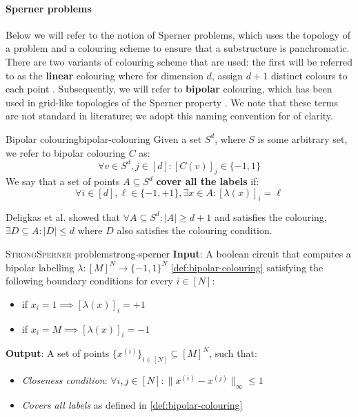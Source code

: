 \paragraph{Sperner problems}

Below we will refer to the notion of Sperner problems, which uses
the topology of a problem and a colouring scheme to ensure
that a substructure is panchromatic. There are two variants of colouring scheme
that are used: the first will be referred to as the \textbf{linear} colouring
where for dimension $d$, assign $d+1$ distinct colours to each point \cite{daskalakis_ComplexityComputingNash_2006, chen_Complexity2DDiscrete_2009}.
Subsequently, we will refer to \textbf{bipolar} colouring, which has been used in grid-like topologies of the Sperner property
\cite{chen_SettlingComplexityComputing_2009, deligkas_PureCircuitTightInapproximability_2024, daskalakis_ComplexityConstrainedMinmax_2021}.
We note that these terms are not standard in literature; we adopt this naming convention
for of clarity.



\begin{definitionbox}{Bipolar colouring}{bipolar-colouring}
    Given a set $S^d$, where $S$ is some arbitrary set, we refer
    to bipolar colouring $C$ as:
    $$
        \forall v \in S^d, j \in [d]: [C(v)]_j \in \{-1,1\}
    $$
    We say that a set of points $A \subseteq S^d$ \textbf{cover all the labels} if:
    $$
        \forall i \in [d], \ell \in \{-1, +1\}, \exists x \in A: [\lambda(x)]_{i} = \ell
    $$

\end{definitionbox}

Deligkas et al. \cite{deligkas_PureCircuitTightInapproximability_2024, deligkas_ConstantInapproximabilityPPA_2022} showed that
$\forall A \subseteq S^d: |A| \geq d+1$ and satisfies the colouring, $\exists D \subseteq A: |D| \leq d$ where $D$ also satisfies
the colouring condition.

\begin{definitionbox}{\textsc{StrongSperner} problem}{strong-sperner}
    \textbf{Input}: A boolean circuit that computes a bipolar labelling $\lambda: [M]^N \to \{-1, 1\}^N$ \ref{def:bipolar-colouring}
    satisfying the following boundary conditions for every $i \in [N]$:
    \begin{itemize}
        \item if $x_i = 1 \implies [\lambda(x)]_i = +1$
        \item if $x_i = M \implies [\lambda(x)]_i = -1$
    \end{itemize}
    \textbf{Output}: A set of points $\{x^{(i)}\}_{i \in [N]} \subseteq [M]^{N}$, such that:
    \begin{itemize}
        \item \textit{Closeness condition}: $\forall i,j \in [N]: \|x^{(i)} - x^{(j)}\|_{\infty} \leq 1$
        \item \textit{Covers all labels} as defined in \ref{def:bipolar-colouring}
    \end{itemize}
\end{definitionbox}

